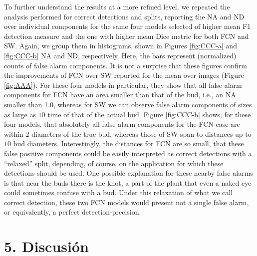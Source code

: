 \documentclass[a4paper,authoryear,review]{elsarticle}
\begin{document}
To further understand the results at a more refined level, we repeated the analysis performed for correct detections and splits, reporting the NA and ND over individual components for the same four models selected of higher mean F1 detection measure and the one with higher mean Dice metric for both FCN and SW. Again, we group them in histograms, shown in Figures \ref{fig:CCC-a} and \ref{fig:CCC-b} NA and ND, respectively. Here, the bars represent (normalized) counts of false alarm components. It is not a surprise that these figures confirm the improvements of FCN over SW reported for the mean over images (Figure \ref{fig:AAA}). For these four models in particular, they show that all false alarm components for FCN have an area smaller than that of the bud, i.e., an NA smaller than 1.0, whereas for SW we can observe false alarm components of sizes as large as $10$ time of that of the actual bud. Figure \ref{fig:CCC-b} shows, for these four models, that absolutely all false alarm components for the FCN case are within $2$ diameters of the true bud, whereas those of SW span to distances up to $10$ bud diameters. Interestingly, the distances for FCN are so small, that these false positive components could be easily interpreted as correct detections with a “relaxed” split, depending, of course, on the application for which these detections should be used.   One possible explanation for these nearby false alarms is that near the buds there is the knot, a part of the plant that even a naked eye could sometimes confuse with a bud. Under this relaxation of what we call correct detection, these two FCN models would present not a single false alarm, or equivalently, a perfect detection-precision.



\section{5. Discusión} \label{sec:discussion}
\end{document}
